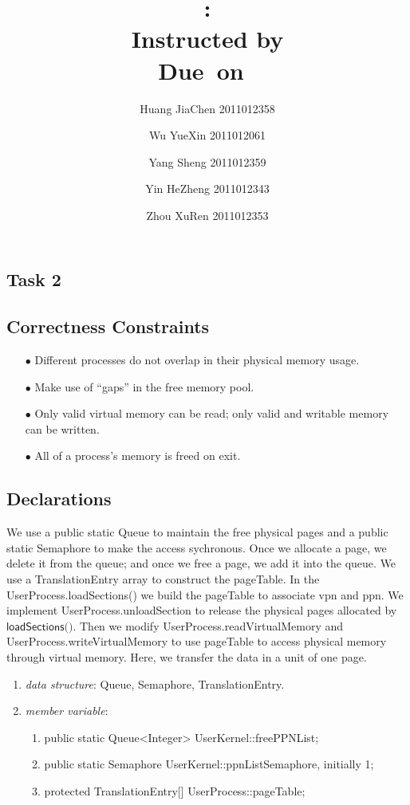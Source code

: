 \documentclass{article}
\title{\textmd{\bf \Class: \Title}\\{\large Instructed by \textit{\ClassInstructor}}\\\normalsize\vspace{0.1in}\small{Due\ on\ \DueDate}}
\date{}
\author{%
  Huang JiaChen 2011012358 \and
  Wu YueXin 2011012061 \and
  Yang Sheng 2011012359 \and
  Yin HeZheng 2011012343 \and
  Zhou XuRen 2011012353}
\begin{document}
  \begin{spacing}{1.1}
    \maketitle \thispagestyle{empty}


    
\section{Task 2}

\subsection{Correctness Constraints}
\begin{enumerate}
  \item[$\bullet$] Different processes do not overlap in their physical memory usage.
  \item[$\bullet$] Make use of ``gaps'' in the free memory pool.
  \item[$\bullet$] Only valid virtual memory can be read; only valid and writable
    memory can be written.
  \item[$\bullet$] All of a process's memory is freed on exit.
\end{enumerate}

\subsection{Declarations}
We use a public static \textsf{Queue} to maintain the free physical pages and a public
static \textsf{Semaphore} to make the access sychronous. Once we allocate a
page, we delete it from the queue; and once we free a page, we add it
into the queue. We use a 
\textsf{TranslationEntry} array to construct the pageTable. In the 
\textsf{UserProcess.loadSections()} we build the pageTable to associate vpn and ppn.
We implement \textsf{UserProcess.unloadSection} to release the physical pages
allocated by $\textsf{loadSections()}$.
Then we modify \textsf{UserProcess.readVirtualMemory} and 
\textsf{UserProcess.writeVirtualMemory} to use pageTable to access physical
memory through virtual memory. Here, we transfer the data in a unit of one page.
\begin{enumerate}[$\bullet$]
  \item \textit{data structure}: \textsf{Queue}, \textsf{Semaphore},
    \textsf{TranslationEntry}.
  \item \textit{member variable}:
    \begin{enumerate}
      \item \textsf{public static Queue<Integer> UserKernel::freePPNList};
      \item \textsf{public static Semaphore UserKernel::ppnListSemaphore}, initially 1;
      \item \textsf{protected TranslationEntry[] UserProcess::pageTable};
      \end{enumerate}
\end{enumerate}


\end{spacing}
\end{document}
